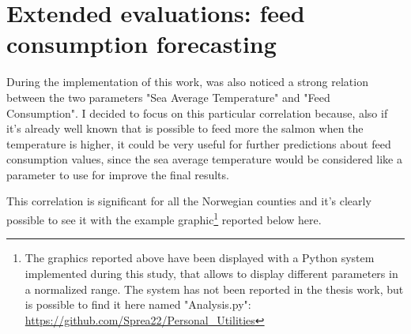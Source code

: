 \newpage

\section{Extended evaluations: feed consumption forecasting }
\label{Discussion2}
During the implementation of this work, was also noticed a strong relation between the two parameters "Sea Average Temperature" and "Feed Consumption".
I decided to focus on this particular correlation because, also if it's already well known that is possible to feed more the salmon when the temperature is higher, it could be very useful for further predictions about feed consumption values, since the sea average temperature would be considered like a parameter to use for improve the final results.

This correlation is significant for all the Norwegian counties and it's clearly possible to see it with the example graphic\footnote{The graphics reported above have been displayed with a Python system implemented during this study, that allows to display different parameters in a normalized range. The system has not been reported in the thesis work, but is possible to find it here named "Analysis.py": \\ \url{https://github.com/Sprea22/Personal_Utilities}} reported below here. 

\vspace{-10mm}

